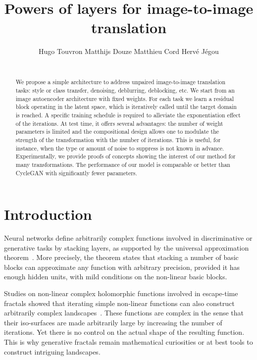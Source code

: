 \documentclass[a4paper,10pt]{extarticle}
\title{Powers of layers for image-to-image translation}
\author{Hugo Touvron  
\hspace{0.32cm} 
Matthijs Douze  
\hspace{0.32cm} 
Matthieu Cord 
\hspace{0.32cm} 
Herv\'e J\'egou 
\\
~\\
\scalebox{1.}{ Facebook AI Research \hspace{0.6cm}  Sorbonne University}
\date{}
}
\begin{document}
\maketitle

\begin{abstract}
We propose a simple architecture to address unpaired image-to-image  translation tasks: style or class transfer, denoising, deblurring, deblocking, etc. 
We start from an image autoencoder architecture with fixed weights. 
For each task we learn a residual block operating in the latent space, which is iteratively called until the target domain is reached. 
A specific training schedule is required to alleviate the exponentiation effect of the iterations. 
At test time, it offers several advantages: the number of weight parameters is limited and the compositional design allows one to modulate the strength of the transformation with the number of iterations. 
This is useful, for instance, when the type or amount of noise to suppress is not known in advance.  
Experimentally, we provide proofs of concepts showing the interest of our method for many transformations. 
The performance of our model is comparable or better than CycleGAN with significantly fewer parameters.
\end{abstract}

\section{Introduction}\label{sec:introduction}


Neural networks define arbitrarily complex functions involved in discriminative or generative tasks by stacking layers, as supported by the universal approximation theorem~\cite{hornik1989multilayer,montufar2014universal,goodfellow2016deep}.
More precisely, the theorem states that stacking a number of basic blocks can approximate any function with arbitrary precision, provided it has enough hidden units, with mild conditions on the non-linear basic blocks.

Studies on non-linear complex holomorphic functions involved in escape-time fractals showed that iterating simple non-linear functions can also construct arbitrarily complex landscapes~\cite{barnsley1988science}.
These functions are complex in the sense that their iso-surfaces are made arbitrarily large by increasing the number of iterations. 
Yet there is no control on the actual shape of the resulting function. This is why generative fractals remain mathematical curiosities or at best
tools to construct intriguing landscapes. 
\end{document}
